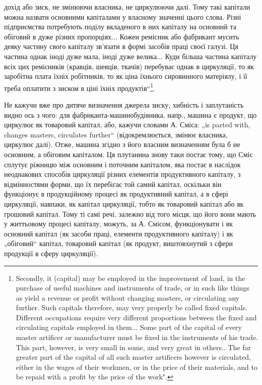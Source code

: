 дохід або зиск, не змінюючи власника, не циркулюючи далі. Тому такі
капітали можна назвати основними капіталами у власному значенні цього
слова. Різні підприємства потребують поділу вкладеного в них капіталу
на основний та обіговий в дуже різних пропорціях... Кожен ремісник
або фабрикант мусить деяку частину свого капіталу зв’язати в формі
засобів праці своєї галузі. Ця частина однак іноді дуже мала, іноді дуже
велика... Куди більша частина капіталу всіх цих ремісників (кравців, шевців,
ткачів) перебуває однак в циркуляції, то як заробітна плата їхніх
робітників, то як ціна їхнього сировинного матеріялу, і її треба оплатити
з зиском в ціні їхніх продуктів“\footnote*{
Secondly, it (capital) may be employed in the improvement of land, in the
purchase of useful machines and instruments of trade, or in such like things as
yield a revenue or profit without changing masters, or circulating any further. Such
capitals therefore, may very properly be called fixed capitals. Different occupations
require very different proportions between the fixed and circulating capitals employed
in them... Some part of the capital of every master artificer or manufacturer
must be fixed in the instruments of his trade. This part, however, is very small in
some, and very great in others.. The far greater part of the capital of all such master
artificers however is circulated, either in the wages of their workmen, or in the
price of their materials, and to be repaid with a profit by the price of the work".
}.

Не кажучи вже про дитяче визначення джерела зиску, хибність і заплутаність
видно ось з чого: для фабриканта-машинобудівника, напр.,
машина є продукт, що циркулює як товаровий капітал, або, кажучи словами
А. Сміса: „is parted with, changes masters, circulates further“ (відокремлюється,
змінює власника, циркулює далі). Отже, машина згідно з
його власним визначенням була б не основним, а обіговим капіталом. Ця
плутанина знову таки постає тому, що Сміс сплутує ріжницю між основним
і поточним капіталом, яка постає в наслідок неоднакових способів
циркуляції різних елементів продуктивного капіталу, з відмінностями
форми, що їх перебігає той самий капітал, оскільки він функціонує
в продукційному процесі як продуктивний капітал, а в сфері
циркуляції, навпаки, як капітал циркуляції, тобто як товаровий капітал
або як грошовий капітал. Тому ті самі речі, залежно від того місця, що
його вони мають у життьовому процесі капіталу, можуть, за А. Смісом,
функціонувати і як основний капітал (як засоби праці, елементи продуктивного
капіталу) і як „обіговий“ капітал, товаровий капітал (як продукт,
виштовхнутий з сфери продукції в сферу циркуляції).

